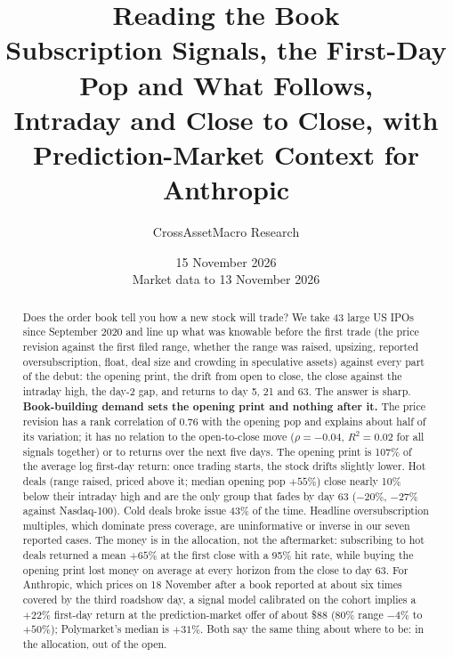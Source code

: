 \documentclass[11pt]{article}
\title{\vspace{-1.2em}\textbf{Reading the Book}\\[0.3em]
\large Subscription Signals, the First-Day Pop and What Follows,\\ Intraday and Close to Close, with Prediction-Market Context for Anthropic}
\author{CrossAssetMacro Research}
\date{15 November 2026\\[0.2em]\small Market data to 13 November 2026}
\begin{document}
\maketitle
\thispagestyle{fancy}

\begin{abstract}
\noindent Does the order book tell you how a new stock will trade? We take 43 large US IPOs since September 2020 and line up what was knowable before the first trade (the price revision against the first filed range, whether the range was raised, upsizing, reported oversubscription, float, deal size and crowding in speculative assets) against every part of the debut: the opening print, the drift from open to close, the close against the intraday high, the day-2 gap, and returns to day 5, 21 and 63. The answer is sharp. \textbf{Book-building demand sets the opening print and nothing after it.} The price revision has a rank correlation of 0.76 with the opening pop and explains about half of its variation; it has no relation to the open-to-close move ($\rho=-0.04$, $R^2=0.02$ for all signals together) or to returns over the next five days. The opening print is 107\% of the average log first-day return: once trading starts, the stock drifts slightly lower. Hot deals (range raised, priced above it; median opening pop $+55\%$) close nearly 10\% below their intraday high and are the only group that fades by day 63 ($-20\%$, $-27\%$ against Nasdaq-100). Cold deals broke issue 43\% of the time. Headline oversubscription multiples, which dominate press coverage, are uninformative or inverse in our seven reported cases. The money is in the allocation, not the aftermarket: subscribing to hot deals returned a mean $+65\%$ at the first close with a 95\% hit rate, while buying the opening print lost money on average at every horizon from the close to day 63. For Anthropic, which prices on 18 November after a book reported at about six times covered by the third roadshow day, a signal model calibrated on the cohort implies a $+22\%$ first-day return at the prediction-market offer of about \$88 (80\% range $-4\%$ to $+50\%$); Polymarket's median is $+31\%$. Both say the same thing about where to be: in the allocation, out of the open.
\end{abstract}
\end{document}
